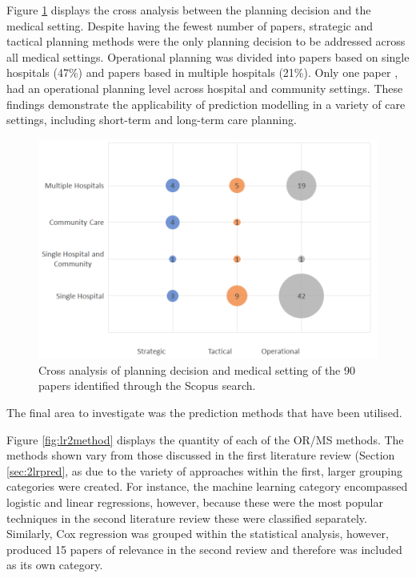 \documentclass[../thesis.tex]{subfiles}
\begin{document}
Figure \ref{fig:lr2cross1} displays the cross analysis between the planning decision and the medical setting. Despite having the fewest number of papers, strategic and tactical planning methods were the only planning decision to be addressed across all medical settings. Operational planning was divided into papers based on single hospitals (47\%) and papers based in multiple hospitals (21\%). Only one paper \cite{Gordon2}, had an operational planning level across hospital and community settings. These findings demonstrate the applicability of prediction modelling in a variety of care settings, including short-term and long-term care planning.

\begin{figure}[h!]
    \centering
    \includegraphics[scale=0.9]{Chapters/Chapter2/Figures3/2lrhospdec.png}
    \caption{Cross analysis of planning decision and medical setting of the 90 papers identified through the Scopus search.}
    \label{fig:lr2cross1}
\end{figure}

\label{sec:2lrpred}
The final area to investigate was the prediction methods that have been utilised. 

Figure \ref{fig:lr2method} displays the quantity of each of the OR/MS methods. The methods shown vary from those discussed in the first literature review (Section \ref{sec:2lrpred}, as due to the variety of approaches within the first, larger grouping categories were created. For instance, the machine learning category encompassed logistic and linear regressions, however, because these were the most popular techniques in the second literature review these were classified separately. Similarly, Cox regression was grouped within the statistical analysis, however, produced 15 papers of relevance in the second review and therefore was included as its own category.
\end{document}
